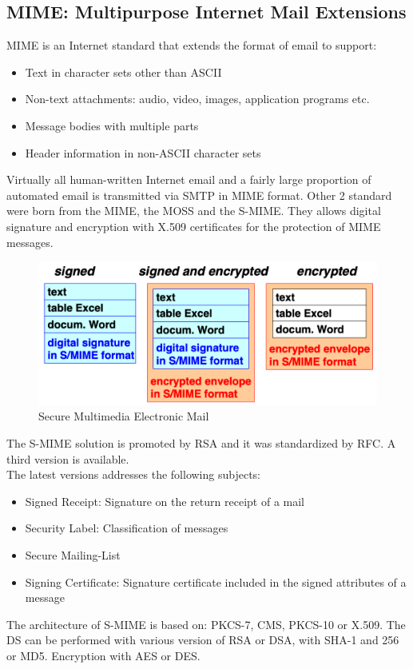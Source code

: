 \documentclass[12pt]{article}
\begin{document}
\subsection{MIME: Multipurpose Internet Mail Extensions}
MIME is an Internet standard that extends the format of email to support:
\begin{itemize}
  \item Text in character sets other than ASCII
  \item Non-text attachments: audio, video, images, application programs etc.
  \item Message bodies with multiple parts
  \item Header information in non-ASCII character sets
\end{itemize}
Virtually all human-written Internet email and a fairly large proportion of automated email is transmitted via SMTP in MIME format. Other 2 standard were born from the MIME, the MOSS and the S-MIME. They allows digital signature and encryption with X.509 certificates for the protection of MIME messages.
\begin{figure}[H]
   \centering
   \includegraphics[width=\linewidth]{images/smime.png}
   \caption{Secure Multimedia Electronic Mail}
   \label{fig:smime}
\end{figure}
The S-MIME solution is promoted by RSA and it was standardized by RFC. A third version is available.\\
The latest versions addresses the following subjects:
\begin{itemize}
  \item Signed Receipt: Signature on the return receipt of a mail
  \item Security Label: Classification of messages
  \item Secure Mailing-List
  \item Signing Certificate: Signature certificate included in the signed attributes of a message
\end{itemize}
The architecture of S-MIME is based on: PKCS-7, CMS, PKCS-10 or X.509. The DS can be performed with various version of RSA or DSA, with SHA-1 and 256 or MD5. Encryption with AES or DES.
\end{document}

